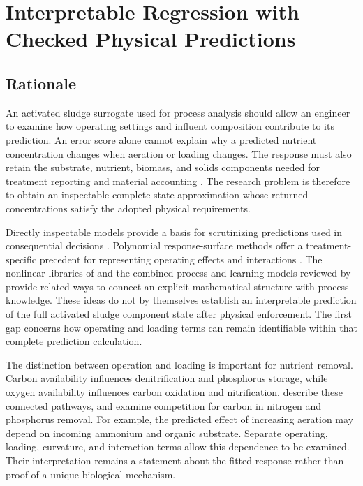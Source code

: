 \chapter{Interpretable Regression with Checked Physical Predictions}
\label{ch:interpretable}

\section{Rationale}

An activated sludge surrogate used for process analysis should allow an engineer to examine how operating settings and influent composition contribute to its prediction. An error score alone cannot explain why a predicted nutrient concentration changes when aeration or loading changes. The response must also retain the substrate, nutrient, biomass, and solids components needed for treatment reporting and material accounting \citep{Henze2006}. The research problem is therefore to obtain an inspectable complete-state approximation whose returned concentrations satisfy the adopted physical requirements.

Directly inspectable models provide a basis for scrutinizing predictions used in consequential decisions \citep{Rudin2019}. Polynomial response-surface methods offer a treatment-specific precedent for representing operating effects and interactions \citep{Nazlabadi2021}. The nonlinear libraries of \citet{Brunton2016} and the combined process and learning models reviewed by \citet{Shen2023} provide related ways to connect an explicit mathematical structure with process knowledge. These ideas do not by themselves establish an interpretable prediction of the full activated sludge component state after physical enforcement. The first gap concerns how operating and loading terms can remain identifiable within that complete prediction calculation.

The distinction between operation and loading is important for nutrient removal. Carbon availability influences denitrification and phosphorus storage, while oxygen availability influences carbon oxidation and nitrification. \citet{Wentzel1992} describe these connected pathways, and \citet{Guerrero2011} examine competition for carbon in nitrogen and phosphorus removal. For example, the predicted effect of increasing aeration may depend on incoming ammonium and organic substrate. Separate operating, loading, curvature, and interaction terms allow this dependence to be examined. Their interpretation remains a statement about the fitted response rather than proof of a unique biological mechanism.

